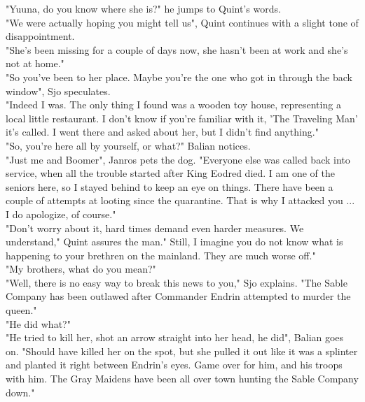 "Yuuna, do you know where she is?" he jumps to Quint's words.\\

"We were actually hoping you might tell us", Quint continues with a slight tone of disappointment.\\

"She's been missing for a couple of days now, she hasn't been at work and she's not at home."\\

"So you've been to her place. Maybe you're the one who got in through the back window", Sjo speculates.\\

"Indeed I was. The only thing I found was a wooden toy house, representing a local little restaurant. I don't know if you're familiar with it, 'The Traveling Man' it's called. I went there and asked about her, but I didn't find anything."\\

"So, you're here all by yourself, or what?" Balian notices.\\

"Just me and Boomer", Janros pets the dog. "Everyone else was called back into service, when all the trouble started after King Eodred died. I am one of the seniors here, so I stayed behind to keep an eye on things. There have been a couple of attempts at looting since the quarantine. That is why I attacked you ... I do apologize, of course."\\

"Don't worry about it, hard times demand even harder measures. We understand," Quint assures the man." Still, I imagine you do not know what is happening to your brethren on the mainland. They are much worse off."\\

"My brothers, what do you mean?"\\

"Well, there is no easy way to break this news to you," Sjo explains. "The Sable Company has been outlawed after Commander Endrin attempted to murder the queen."\\

"He did what?"\\

"He tried to kill her, shot an arrow straight into her head, he did", Balian goes on. "Should have killed her on the spot, but she pulled it out like it was a splinter and planted it right between Endrin's eyes. Game over for him, and his troops with him. The Gray Maidens have been all over town hunting the Sable Company down."\\

